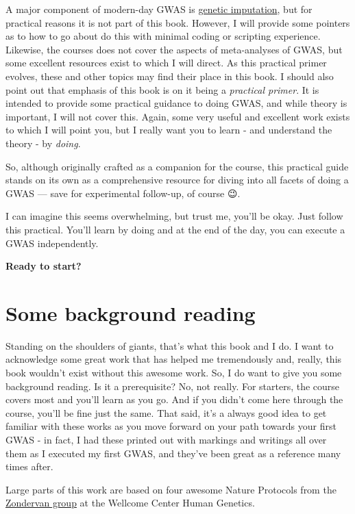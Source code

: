 \documentclass[
]{book}
\begin{document}
A major component of modern-day GWAS is \href{https://www.nature.com/articles/nrg2796}{genetic imputation}, but for practical reasons it is not part of this book. However, I will provide some pointers as to how to go about do this with minimal coding or scripting experience. Likewise, the courses does not cover the aspects of meta-analyses of GWAS, but some excellent resources exist to which I will direct. As this practical primer evolves, these and other topics may find their place in this book.
I should also point out that emphasis of this book is on it being a \emph{practical primer}. It is intended to provide some practical guidance to doing GWAS, and while theory is important, I will not cover this. Again, some very useful and excellent work exists to which I will point you, but I really want you to learn - and understand the theory - by \emph{doing}.

So, although originally crafted as a companion for the course, this practical guide stands on its own as a comprehensive resource for diving into all facets of doing a GWAS --- save for experimental follow-up, of course 😉.

I can imagine this seems overwhelming, but trust me, you'll be okay. Just follow this practical. You'll learn by doing and at the end of the day, you can execute a GWAS independently.

\textbf{Ready to start?}

\hypertarget{somebackgroundreading}{%
\chapter{Some background reading}\label{somebackgroundreading}}

Standing on the shoulders of giants, that's what this book and I do. I want to acknowledge some great work that has helped me tremendously and, really, this book wouldn't exist without this awesome work. So, I do want to give you some background reading. Is it a prerequisite? No, not really. For starters, the course covers most and you'll learn as you go. And if you didn't come here through the course, you'll be fine just the same. That said, it's a always good idea to get familiar with these works as you move forward on your path towards your first GWAS - in fact, I had these printed out with markings and writings all over them as I executed my first GWAS, and they've been great as a reference many times after.

Large parts of this work are based on four awesome Nature Protocols from the \href{https://www.well.ox.ac.uk/research/research-groups/zondervan-group}{Zondervan group} at the Wellcome Center Human Genetics.
\end{document}
